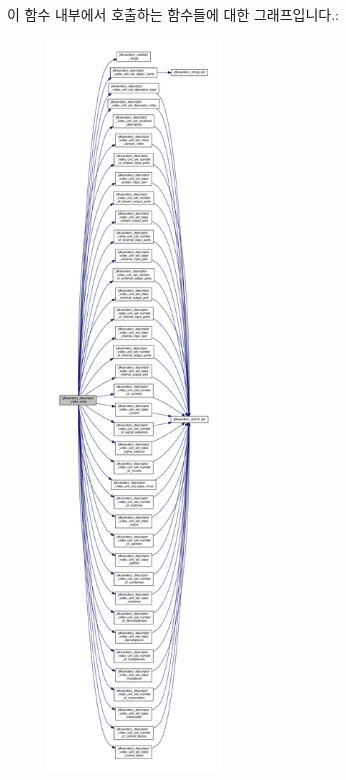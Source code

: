 이 함수 내부에서 호출하는 함수들에 대한 그래프입니다.\+:
\nopagebreak
\begin{figure}[H]
\begin{center}
\leavevmode
\includegraphics[height=550pt]{group__descriptor__video_gae8ef443664911faea85277dfd46bed8e_cgraph}
\end{center}
\end{figure}


